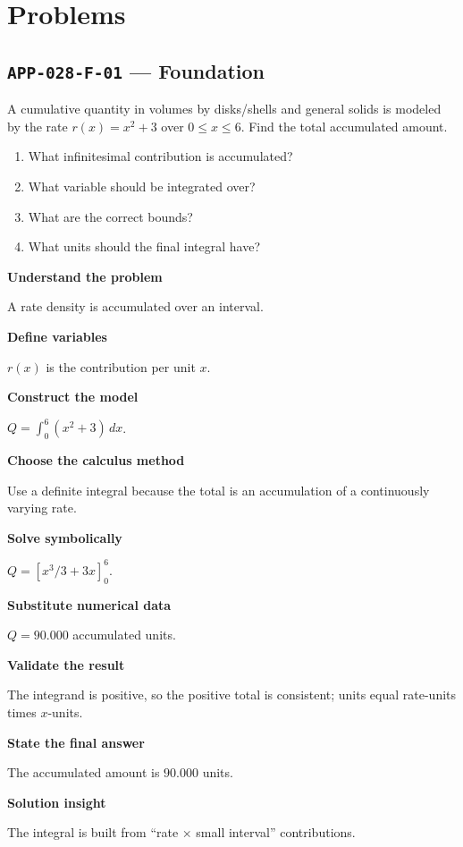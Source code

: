 \documentclass[11pt]{book}
\newcommand{\pid}[1]{\texttt{#1}}
\begin{document}
\section*{Problems}
\subsection*{\pid{APP-028-F-01} — Foundation}
\begin{problembox}
A cumulative quantity in volumes by disks/shells and general solids is modeled by the rate $r(x)=x^2+3$ over $0\le x\le 6$. Find the total accumulated amount.
\end{problembox}
\begin{promptbox}\begin{enumerate}
\item What infinitesimal contribution is accumulated?
\item What variable should be integrated over?
\item What are the correct bounds?
\item What units should the final integral have?
\end{enumerate}\end{promptbox}
\begin{solutionbox}
\textbf{Understand the problem}\par A rate density is accumulated over an interval.\par\medskip
\textbf{Define variables}\par $r(x)$ is the contribution per unit $x$.\par\medskip
\textbf{Construct the model}\par $Q=\int_0^{6}(x^2+3)\,dx$.\par\medskip
\textbf{Choose the calculus method}\par Use a definite integral because the total is an accumulation of a continuously varying rate.\par\medskip
\textbf{Solve symbolically}\par $Q=[x^3/3+3x]_0^{6}$.\par\medskip
\textbf{Substitute numerical data}\par $Q=90.000$ accumulated units.\par\medskip
\textbf{Validate the result}\par The integrand is positive, so the positive total is consistent; units equal rate-units times $x$-units.\par\medskip
\textbf{State the final answer}\par The accumulated amount is $90.000$ units.\par\medskip
\textbf{Solution insight}\par The integral is built from “rate × small interval” contributions.\par\medskip
\end{solutionbox}
\end{document}
